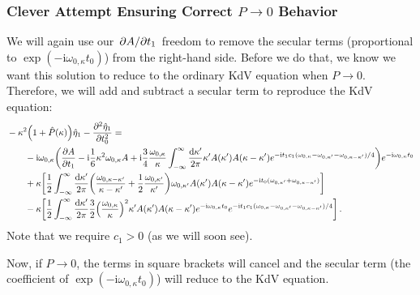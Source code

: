 \documentclass{jfm}
\let\Oldsubsubsection\subsubsection
\renewcommand{\subsubsection}{\FloatBarrier\Oldsubsubsection}
\newcommand{\GenPk}{\hat{P}(\kappa)}
\newcommand{\im}{\mathrm{i}}
\begin{document}
\subsubsection{Clever Attempt Ensuring Correct \texorpdfstring{$P \to
0$}{Unforced} Behavior}
We will again use our $\pdv*{A}{t_1}$ freedom to remove the
secular terms (proportional to $\exp(-\im \omega_{0,\kappa} t_0)$) from
the right-hand side.
Before we do that, we know we want this solution to reduce to the
ordinary KdV equation when $P \to 0$.
Therefore, we will add and subtract a secular term to reproduce the KdV
equation:
\begin{equation}
  \begin{split}
  &-\kappa^2 \pqty{1 + \GenPk} \hat{\eta}_1 - \pdv[2]{\hat{\eta}_1}{t_0}
    = \\
  &\qquad
    -\im \omega_{0,\kappa} \pqty{ \pdv{A}{t_1}
    - \im \frac{1}{6} \kappa^2 \omega_{0,\kappa} A
    + \im \frac{3}{4} \frac{\omega_{0,\kappa}}{\kappa}
    \int_{-\infty}^{\infty} \frac{\dd{\kappa'}}{2 \pi}
    \kappa' A(\kappa') A(\kappa-\kappa')
    e^{-\im t_1 c_1 (\omega_{0,\kappa} - \omega_{0,\kappa'} -
    \omega_{0,\kappa-\kappa'})/4}
    } e^{-\im \omega_{0,\kappa} t_0}
    \\
    &\qquad
    + \kappa \bqty{\frac{1}{2} \int_{-\infty}^{\infty}
      \frac{\dd{\kappa'}}{2 \pi}
    \pqty{
      \frac{\omega_{0,\kappa-\kappa'}}{\kappa-\kappa'}
      + \frac{1}{2} \frac{\omega_{0,\kappa'}}{\kappa'}
    } \omega_{0,\kappa'} A(\kappa') A(\kappa-\kappa')
    e^{-\im t_0 (\omega_{0,\kappa'} + \omega_{0,\kappa-\kappa'})}} \\
    &\qquad
    -\kappa \bqty{\frac{1}{2} \int_{-\infty}^{\infty}
      \frac{\dd{\kappa'}}{2 \pi} \frac{3}{2}
      \pqty{\frac{\omega_{0,\kappa}}{\kappa}}^2 \kappa' A(\kappa')
      A(\kappa-\kappa') e^{-\im \omega_{0,\kappa} t_0}
      e^{-\im t_1 c_1 (\omega_{0,\kappa} - \omega_{0,\kappa'} -
      \omega_{0,\kappa-\kappa'})/4}
      } \,.
  \end{split}
  \label{eq:strong_first_order_int}
\end{equation}
Note that we require $c_1 > 0$ (as we will soon see).

Now, if $P \to 0$, the terms in square brackets will cancel and the
secular term (the coefficient of $\exp(-\im \omega_{0,\kappa} t_0)$)
will reduce to the KdV equation.
\end{document}
